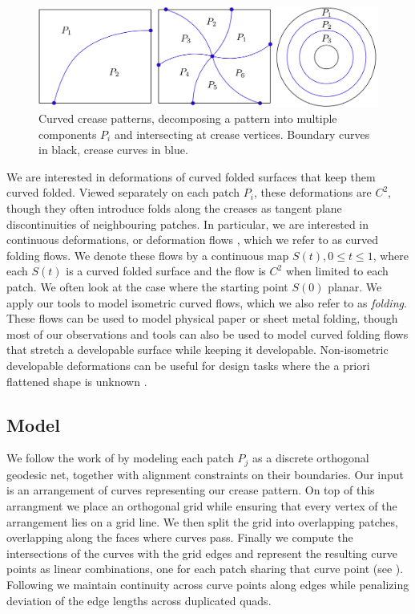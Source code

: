 \begin{figure} [h]
	\centering
	\includegraphics[width=\linewidth]{figures/crease_patterns}
	\caption{Curved crease patterns, decomposing a pattern into multiple components $P_i$ and intersecting at crease vertices. Boundary curves in black, crease curves in blue.}
	\label{fig:crease_pattern}
\end{figure}

We are interested in deformations of curved folded surfaces that keep them curved folded. Viewed separately on each patch $P_i$, these deformations are $C^2$, though they often introduce folds along the creases as tangent plane discontinuities of neighbouring patches. In particular, we are interested in continuous deformations, or deformation flows \cite{rabi2018shape}, which we refer to as curved folding flows. We denote these flows by a continuous map $S(t), 0 \leq t \leq 1$, where each $S(t)$ is a curved folded surface and the flow is $C^2$ when limited to each patch. We often look at the case where the starting point $S(0)$ planar. We apply our tools to model isometric curved flows, which we also refer to as \emph{folding}. These flows can be used to model physical paper or sheet metal folding, though most of our observations and tools can also be used to model curved folding flows that stretch a developable surface while keeping it developable. Non-isometric developable deformations can be useful for design tasks where the a priori flattened shape is unknown \cite{rabi18,rabi2018shape,pottmann_new}.

\subsection{Model} \label{sec:model}
We follow the work of \cite{rabi2018shape} by modeling each patch $P_j$ as a discrete orthogonal geodesic net, together with alignment constraints on their boundaries. Our input is an arrangement of curves representing our crease pattern. On top of this arrangment we place an orthogonal grid while ensuring that every vertex of the arrangement lies on a grid line. We then split the grid into overlapping patches, overlapping along the faces where curves pass. Finally we compute the intersections of the curves with the grid edges and represent the resulting curve points as linear combinations, one for each patch sharing that curve point (see ). Following \cite{rabi18} we maintain continuity across curve points along edges while penalizing deviation of the  edge lengths across duplicated quads. 


